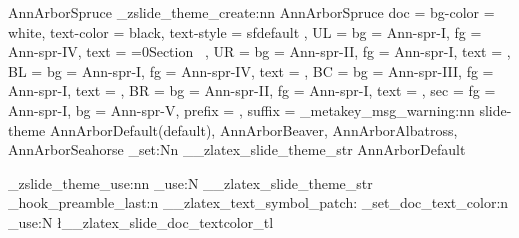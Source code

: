 {  %
  {AnnArborSpruce}{
    \_zslide_theme_create:nn {AnnArborSpruce}{
      doc = {
        bg-color = white,
        text-color = black,
        text-style = sfdefault
      },
      UL = {
        bg   = Ann-spr-I,
        fg   = Ann-spr-IV,
        text = {\ifnum{}=0\else Section\ \thesection\fi}
      },
      UR = {
        bg   = Ann-spr-II,
        fg   = Ann-spr-I,
        text = {\zslideDefaultUR}
      },
      BL = {
        bg   = Ann-spr-I,
        fg   = Ann-spr-IV,
        text = \zslideAuthor
      },
      BC = {
        bg   = Ann-spr-III,
        fg   = Ann-spr-I,
        text = \zslideTitle
      },
      BR = {
        bg   = Ann-spr-II,
        fg   = Ann-spr-I,
        text = \zslideDefaultBR
      },
      sec = {
        fg   = Ann-spr-I,
        bg   = Ann-spr-V,
        prefix = {},
        suffix = {}
      }
    }
  }
}{
  \zlatex_metakey_msg_warning:nn {slide-theme}{
    AnnArborDefault(default), AnnArborBeaver, 
    AnnArborAlbatross, AnnArborSeahorse
  }
  \str_set:Nn \g__zlatex_slide_theme_str {AnnArborDefault}
}


\_zslide_theme_use:nn { \str_use:N \g__zlatex_slide_theme_str }{}
\zlatex_hook_preamble_last:n 
  { 
    \pagestyle{empty} 
    \__zlatex_text_symbol_patch:
    \zslide_set_doc_text_color:n { \tl_use:N \l__zlatex_slide_doc_textcolor_tl }
    \renewcommand{\familydefault}{ \tl_use:c {\l__zlatex_slide_doc_textstyle_tl} }
    \renewcommand{\CJKfamilydefault}{ \tl_use:c {CJK\l__zlatex_slide_doc_textstyle_tl} }
  }